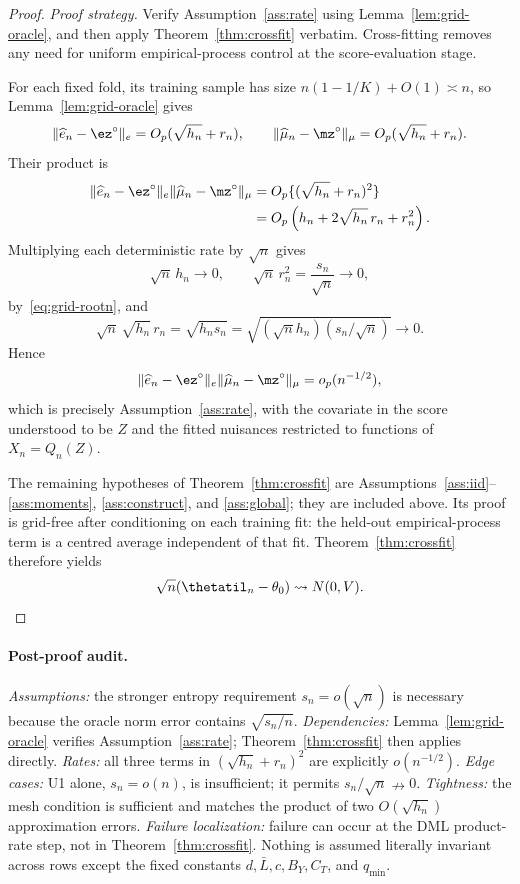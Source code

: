 \begin{proof}
\emph{Proof strategy.}
Verify Assumption~\ref{ass:rate} using Lemma~\ref{lem:grid-oracle}, and then
apply Theorem~\ref{thm:crossfit} verbatim.  Cross-fitting removes any need for
uniform empirical-process control at the score-evaluation stage.

For each fixed fold, its training sample has size
$n(1-1/K)+O(1)\asymp n$, so Lemma~\ref{lem:grid-oracle} gives
\[
 \|\widehat e_n-\ez^\circ\|_e
   =O_p(\sqrt{h_n}+r_n),
 \qquad
 \|\widehat\mu_n-\mz^\circ\|_\mu
   =O_p(\sqrt{h_n}+r_n).
\]
Their product is
\begin{align}
 \|\widehat e_n-\ez^\circ\|_e
 \|\widehat\mu_n-\mz^\circ\|_\mu
 &=O_p\{(\sqrt{h_n}+r_n)^2\}\\
 &=O_p\left(h_n+2\sqrt{h_n}\,r_n+r_n^2\right).
\end{align}
Multiplying each deterministic rate by $\sqrt n$ gives
\[
 \sqrt n\,h_n\to0,
 \qquad
 \sqrt n\,r_n^2=\frac{s_n}{\sqrt n}\to0,
\]
by~\eqref{eq:grid-rootn}, and
\[
 \sqrt n\,\sqrt{h_n}\,r_n
 =\sqrt{h_ns_n}
 =\sqrt{(\sqrt n h_n)(s_n/\sqrt n)}
 \longrightarrow0.
\]
Hence
\[
 \|\widehat e_n-\ez^\circ\|_e
 \|\widehat\mu_n-\mz^\circ\|_\mu
 =o_p(n^{-1/2}),
\]
which is precisely Assumption~\ref{ass:rate}, with the covariate in the score
understood to be $Z$ and the fitted nuisances restricted to functions of
$X_n=Q_n(Z)$.

The remaining hypotheses of Theorem~\ref{thm:crossfit} are
Assumptions~\ref{ass:iid}--\ref{ass:moments},
\ref{ass:construct}, and \ref{ass:global}; they are included above.
Its proof is grid-free after conditioning on each training fit: the held-out
empirical-process term is a centred average independent of that fit.
Theorem~\ref{thm:crossfit} therefore yields
\[
 \sqrt n(\thetatil_n-\theta_0)\rightsquigarrow N(0,V).
\]
\end{proof}

\paragraph{Post-proof audit.}
\emph{Assumptions:} the stronger entropy requirement
$s_n=o(\sqrt n)$ is necessary because the oracle norm error contains
$\sqrt{s_n/n}$.
\emph{Dependencies:} Lemma~\ref{lem:grid-oracle} verifies
Assumption~\ref{ass:rate}; Theorem~\ref{thm:crossfit} then applies directly.
\emph{Rates:} all three terms in
$(\sqrt{h_n}+r_n)^2$ are explicitly $o(n^{-1/2})$.
\emph{Edge cases:} U1 alone, $s_n=o(n)$, is insufficient; it permits
$s_n/\sqrt n\nrightarrow0$.
\emph{Tightness:} the mesh condition is sufficient and matches the product
of two $O(\sqrt{h_n})$ approximation errors.
\emph{Failure localization:} failure can occur at the DML product-rate step,
not in Theorem~\ref{thm:crossfit}.
Nothing is assumed literally invariant across rows except the fixed constants
$d,\bar L,c,B_Y,C_T$, and $q_{\min}$.

